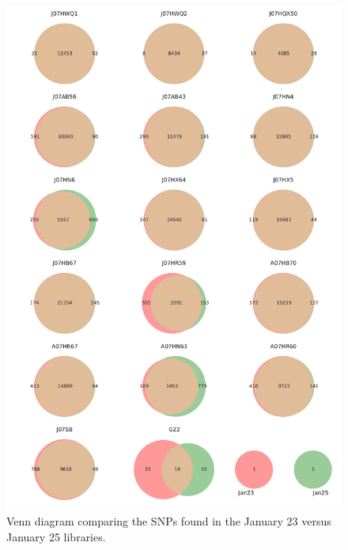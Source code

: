 \begin{figure}[!hbtp]
  \centering
  \includegraphics[width=\textwidth,height=0.9\textheight,keepaspectratio]{Chapter5/Figures/Venn_JanuarySNPs.pdf}
  \caption{Venn diagram comparing the SNPs found in the January 23 versus January 25 libraries.}
  \label{VennJan}
\end{figure}

